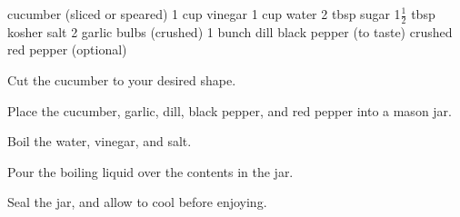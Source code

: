 \dishtype{\pickle}
\begin{ingreds}
    cucumber (sliced or speared)
    1 cup vinegar
    1 cup water
    2 tbsp sugar
    1$\frac{1}{2}$ tbsp kosher salt
    2 garlic bulbs (crushed)
    1 bunch dill
    black pepper (to taste)
    crushed red pepper (optional)
\end{ingreds}
\begin{method}
    Cut the cucumber to your desired shape.\par
    Place the cucumber, garlic, dill, black pepper, and red pepper into a mason jar.\par
    Boil the water, vinegar, and salt.\par
    Pour the boiling liquid over the contents in the jar.\par
    Seal the jar, and allow to cool before enjoying.
\end{method}